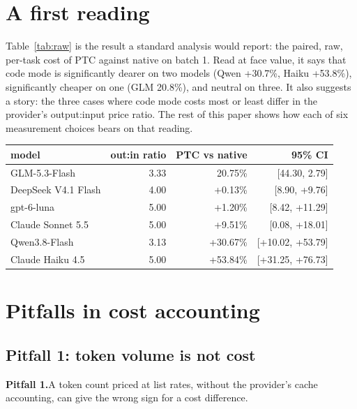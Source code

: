 \documentclass[10pt]{article}
\newcommand*{\mi}{\textminus}   %
\newenvironment{inlinetable}{\par\medskip\noindent\begin{minipage}{\linewidth}\centering\small}{\end{minipage}\par\bigskip}
\newenvironment{pitfall}[1]{\par\medskip\noindent\begin{lrbox}{\pitbox}\begin{minipage}{\dimexpr\linewidth-2\fboxsep-2\fboxrule\relax}\small\textbf{#1}\enskip}{\end{minipage}\end{lrbox}\fbox{\usebox{\pitbox}}\par\medskip}
\begin{document}
\section{A first reading}\label{sec:naive}

Table~\ref{tab:raw} is the result a standard analysis would report: the paired, raw, per-task cost of
PTC against native on batch 1. Read at face value, it says that code mode is significantly dearer on
two models (Qwen +30.7\%, Haiku +53.8\%), significantly cheaper on one (GLM \mi{}20.8\%), and neutral
on three. It also suggests a story: the three cases where code mode costs most or least differ in the
provider's output:input price ratio. The rest of this paper shows how each of six measurement choices
bears on that reading.

\begin{inlinetable}
\label{tab:raw}
\begin{tabular}{@{}lrrr@{}}
\toprule
model & out:in ratio & PTC vs native & 95\% CI \\
\midrule
GLM-5.3-Flash & 3.33 & \mi{}20.75\% & [\mi{}44.30, \mi{}2.79] \\
DeepSeek V4.1 Flash & 4.00 & +0.13\% & [\mi{}8.90, +9.76] \\
gpt-6-luna & 5.00 & +1.20\% & [\mi{}8.42, +11.29] \\
Claude Sonnet 5.5 & 5.00 & +9.51\% & [\mi{}0.08, +18.01] \\
Qwen3.8-Flash & 3.13 & +30.67\% & [+10.02, +53.79] \\
Claude Haiku 4.5 & 5.00 & +53.84\% & [+31.25, +76.73] \\
\bottomrule
\end{tabular}
\end{inlinetable}

\section{Pitfalls in cost accounting}\label{sec:accounting}

\subsection{Pitfall 1: token volume is not cost}\label{sec:p1}

\begin{pitfall}{Pitfall 1.}A token count priced at list rates, without the provider's cache
accounting, can give the wrong sign for a cost difference.\end{pitfall}
\end{document}
